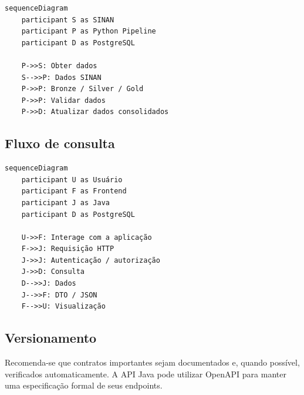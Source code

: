 \begin{lstlisting}[language=Mermaid]
sequenceDiagram
    participant S as SINAN
    participant P as Python Pipeline
    participant D as PostgreSQL

    P->>S: Obter dados
    S-->>P: Dados SINAN
    P->>P: Bronze / Silver / Gold
    P->>P: Validar dados
    P->>D: Atualizar dados consolidados
\end{lstlisting}

\subsection{Fluxo de consulta}

\begin{lstlisting}[language=Mermaid]
sequenceDiagram
    participant U as Usuário
    participant F as Frontend
    participant J as Java
    participant D as PostgreSQL

    U->>F: Interage com a aplicação
    F->>J: Requisição HTTP
    J->>J: Autenticação / autorização
    J->>D: Consulta
    D-->>J: Dados
    J-->>F: DTO / JSON
    F-->>U: Visualização
\end{lstlisting}

\subsection{Versionamento}

Recomenda-se que contratos importantes sejam documentados e, quando possível, verificados automaticamente. A API Java pode utilizar OpenAPI para manter uma especificação formal de seus endpoints.
